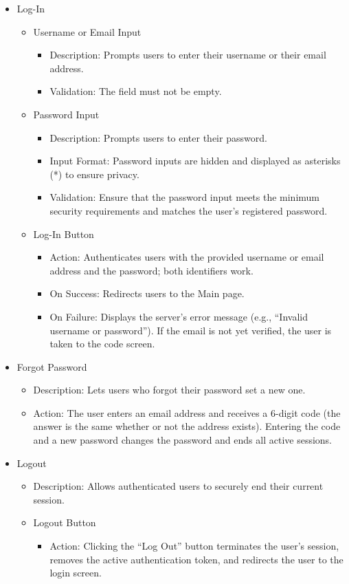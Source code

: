 \documentclass[conference]{IEEEtran}
\begin{document}
\begin{itemize}
    \item Log-In
    \begin{itemize}
        \item Username or Email Input
        \begin{itemize}
            \item Description: Prompts users to enter their username or their email address.
            \item Validation: The field must not be empty.
        \end{itemize}
        \item Password Input
        \begin{itemize}
            \item Description: Prompts users to enter their password.
            \item Input Format: Password inputs are hidden and displayed as asterisks (*) to ensure privacy.
            \item Validation: Ensure that the password input meets the minimum security requirements and matches the user's registered password.
        \end{itemize}
        \item Log-In Button
        \begin{itemize}
            \item Action: Authenticates users with the provided username or email address and the password; both identifiers work.
            \item On Success: Redirects users to the Main page.
            \item On Failure: Displays the server's error message (e.g., ``Invalid username or password''). If the email is not yet verified, the user is taken to the code screen.
        \end{itemize}
    \end{itemize}

    \item Forgot Password
    \begin{itemize}
        \item Description: Lets users who forgot their password set a new one.
        \item Action: The user enters an email address and receives a 6-digit code (the answer is the same whether or not the address exists). Entering the code and a new password changes the password and ends all active sessions.
    \end{itemize}

    \item Logout
    \begin{itemize}
        \item Description: Allows authenticated users to securely end their current session.
        \item Logout Button
        \begin{itemize}
            \item Action: Clicking the ``Log Out'' button terminates the user's session, removes the active authentication token, and redirects the user to the login screen.
        \end{itemize}
    \end{itemize}


\end{itemize}
\end{document}
